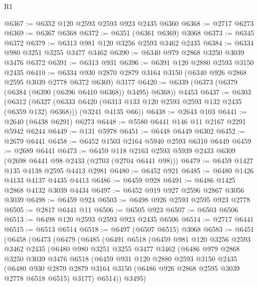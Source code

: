 \begin{lexlean}{R1}
\begin{coremodule}
@6367 := @6352 @120 @2593 @2593 @923 @2435 @6360
@6368 := @2717 @6273
@6369 := @6367 @6368
@6372 := @6351 (@6361 @6369) @3068
@6373 := @6345 @6372
@6379 := @6313 @981 @120 @3256 @2593 @3462 @2435
@6384 := @6334 @980 @3251 @3255 @3477 @3462
@6390 := @6340 @979 @2868 @3250 @3039 @3476 @6372
@6391 := @6313 @931
@6396 := @6391 @120 @2880 @2593 @3150 @2435
@6410 := @6334 @930 @2870 @2879 @3164 @3150 (@6340 @926 @2868 @2595 @3039 @2778 @6372 @6369) @3177
@6420 := @6339 (@6373 (@6379 (@6384 (@6390 (@6396 @6410 @6368)) @3495) @6368)) @4453
@6437 := @6303
    (@6312
      (@6327 (@6333 @6420 (@6313 @133 @120 @2593 @2593 @132 @2435 (@6359 @132) @6368)))
      (@3241 @4135 @66))
@6438 := @2643 @103
@6441 := @2640 (@6438 @6291) @6273
@6448 := @5580 @6441 @146 @11 @2167 @2291 @5942 @6244
@6449 := @131 @5978
@6451 := @6448 @6449 @6302
@6452 := @2679 @6441
@6458 := @6452 @1503 @2164 @5940 @2593 @6310 @6449
@6459 := @2689 @6441
@6473 := @6459 @118 @2163 @2593 @5939 @2433 @6309 (@2698 @6441 @98 @2433 (@2703 (@2704 @6441 @98)))
@6479 := @6459 @1427 @135 @4138 @2595 @4413 @2981
@6480 := @6452 @921
@6485 := @6480 @1426 @4133 @4137 @4435 @4413
@6486 := @6459 @928
@6491 := @6486 @1425 @2868 @4132 @3039 @4434
@6497 := @6452 @919 @927 @2596 @2867 @3056 @3039
@6498 := @6459 @924
@6503 := @6498 @926 @2593 @2595 @923 @2778
@6505 := @2817 @6441 @11
@6506 := @6505 @923
@6507 := @6503 @6506
@6513 := @6498 @120 @2593 @2593 @923 @2435 @6506
@6514 := @2717 @6441
@6515 := @6513 @6514
@6518 := @6497 (@6507 @6515) @3068
@6583 := @6451
    (@6458
      (@6473
        (@6479
          (@6485
            (@6491
              @6518
              (@6459
                @981
                @120
                @3256
                @2593
                @3462
                @2435
                (@6480
                  @980
                  @3251
                  @3255
                  @3477
                  @3462
                  (@6486
                    @979
                    @2868
                    @3250
                    @3039
                    @3476
                    @6518
                    (@6459
                      @931
                      @120
                      @2880
                      @2593
                      @3150
                      @2435
                      (@6480
                        @930
                        @2870
                        @2879
                        @3164
                        @3150
                        (@6486 @926 @2868 @2595 @3039 @2778 @6518 @6515)
                        @3177)
                      @6514))
                  @3495)

\end{coremodule}
\end{lexlean}
